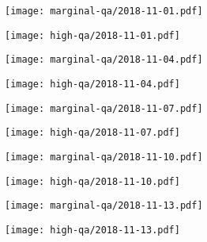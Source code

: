 \documentclass{article}
\begin{document}
\begin{figure}[H]
	\ContinuedFloat
	\centering
	\begin{subfigure}{0.48\linewidth}
		\texttt{[image: marginal-qa/2018-11-01.pdf]}
	\end{subfigure}
	\begin{subfigure}{0.48\linewidth}
		\texttt{[image: high-qa/2018-11-01.pdf]}
	\end{subfigure}
	\begin{subfigure}{0.48\linewidth}
		\texttt{[image: marginal-qa/2018-11-04.pdf]}
	\end{subfigure}
	\begin{subfigure}{0.48\linewidth}
		\texttt{[image: high-qa/2018-11-04.pdf]}
	\end{subfigure}
	\begin{subfigure}{0.48\linewidth}
		\texttt{[image: marginal-qa/2018-11-07.pdf]}
	\end{subfigure}
	\begin{subfigure}{0.48\linewidth}
		\texttt{[image: high-qa/2018-11-07.pdf]}
	\end{subfigure}
	\begin{subfigure}{0.48\linewidth}
		\texttt{[image: marginal-qa/2018-11-10.pdf]}
	\end{subfigure}
	\begin{subfigure}{0.48\linewidth}
		\texttt{[image: high-qa/2018-11-10.pdf]}
	\end{subfigure}
	\begin{subfigure}{0.48\linewidth}
		\texttt{[image: marginal-qa/2018-11-13.pdf]}
	\end{subfigure}
	\begin{subfigure}{0.48\linewidth}
		\texttt{[image: high-qa/2018-11-13.pdf]}
	\end{subfigure}
\end{figure}
\end{document}
